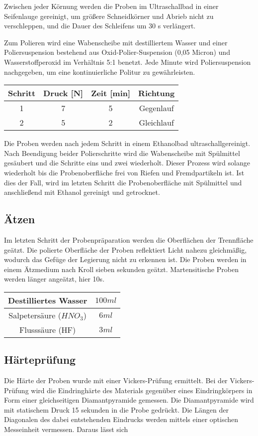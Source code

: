 Zwischen jeder Körnung werden die Proben im Ultraschallbad in einer Seifenlauge gereinigt, um größere Schneidkörner und Abrieb nicht zu verschleppen, und die Dauer des Schleifens um 30 s verlängert. 

Zum Polieren wird eine Wabenscheibe mit destilliertem Wasser und einer Poliersuspension bestehend aus Oxid-Polier-Suspension (0,05 Micron) und Wasserstoffperoxid im Verhältnis 5:1 benetzt. Jede Minute wird Poliersuspension nachgegeben, um eine kontinuierliche Politur zu gewährleisten. 

\begin{tabular}{|c|c|c|c|}
	\hline 
	Schritt & Druck [N] & Zeit [min] & Richtung \\ 
	\hline 
	1 & 7 & 5 & Gegenlauf \\ 
	\hline 
	2 & 5 & 2 & Gleichlauf \\ 
	\hline 
\end{tabular} 


Die Proben werden nach jedem Schritt in einem Ethanolbad ultraschallgereinigt. Nach Beendigung beider Polierschritte wird die Wabenscheibe mit Spülmittel gesäubert und die Schritte eins und zwei wiederholt. Dieser Prozess wird solange wiederholt bis die Probenoberfläche frei von Riefen und Fremdpartikeln ist. Ist dies der Fall, wird im letzten Schritt die Probenoberfläche mit Spülmittel und anschließend mit Ethanol gereinigt und getrocknet. 


\subsection{Ätzen}

Im letzten Schritt der Probenpräparation werden die Oberflächen der Trennfläche geätzt. Die polierte Oberfläche der Proben reflektiert Licht nahezu gleichmäßig, wodurch das Gefüge der Legierung nicht zu erkennen ist. 
Die Proben werden in einem Ätzmedium nach Kroll sieben sekunden geätzt. Martensitische Proben werden länger angeätzt, hier 10s. 

\begin{tabular}{|c|c|}
	\hline 
	Destilliertes Wasser
	& $100ml$
	\\ 
	\hline 
	Salpetersäure ($HNO_{3}$)	& $6ml$
	\\ 
	\hline 
	Flusssäure (HF) & $3ml$
	\\ 
	\hline 
\end{tabular} 


\subsection{Härteprüfung}

Die Härte der Proben wurde mit einer Vickers-Prüfung ermittelt. Bei der Vickers-Prüfung wird die Eindringhärte des Materials gegenüber eines Eindringkörpers in Form einer gleichseitigen Diamantpyramide gemessen. Die Diamantpyramide wird mit statischem Druck 15 sekunden in die Probe gedrückt. Die Längen der Diagonalen des dabei entstehenden Eindrucks werden mittels einer optischen Messeinheit vermessen. Daraus lässt sich 

